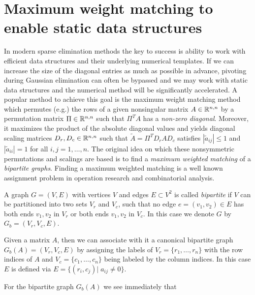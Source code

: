 \section{Maximum weight matching to enable static data structures}
\label{sec:mwm}
In modern sparse elimination methods the key to success 
is ability to work with efficient data structures and their underlying
numerical templates. If we can increase the size of the diagonal entries
as much as possible in advance, pivoting during Gaussian elimination can often 
be bypassed and we may work with static data structures and
the numerical method will be significantly accelerated. 
A popular method to achieve this goal is the
maximum weight matching method~\cite{DufK99S,olschowka:1996} 
which permutes (e.g.) the rows of a given
nonsingular matrix $A\in\mathbb{R}^{n,n}$ by a permutation matrix $\Pi\in\mathbb{R}^{n,n}$ 
such that $\Pi^TA$
has a \emph{non-zero diagonal}. Moreover, it maximizes 
the product of the absolute diagonal values  and yields diagonal
scaling matrices $D_r, D_c\in\mathbb{R}^{n,n}$ such that $\tilde A=\Pi^TD_rAD_c$ satisfies
$|\tilde a_{ij}|\leqslant 1$ and $|\tilde a_{ii}|=1$ for all $i,j=1,\dots,n$.
The original idea on which these nonsymmetric permutations and scalings are
based is to find a \emph{maximum weighted matching} of a
\emph{bipartite graphs}. Finding a maximum weighted matching is a well
known assignment problem in operation research and combinatorial
analysis.
\begin{definition}\label{def:bipartite}
A graph $G=(V,E)$ with vertices $V$ and edges $E\subset V^2$ 
is called \emph{bipartite} 
if $V$ can be partitioned into two sets  $V_r$ and  $V_c$, such that no edge
$e=(v_1,v_2) \in E$ has both ends $v_1,v_2$ in $V_r$ or both ends $v_1,v_2$ 
in $V_c$. In this case we denote $G$ by $G_b=(V_r,V_c,E)$.
\end{definition}
\begin{definition}\label{def:bipartite-graph}
Given a matrix $A$, then we can associate with it a canonical
bipartite graph $G_b(A)=(V_r,V_c,E)$ by assigning the 
labels of $V_r=\{r_1,\dots,r_n\}$ 
with the row indices of $A$ and 
$V_c=\{c_1,\dots,c_n\}$ being labeled by the column indices.
In this case $E$ is defined via $E=\{(r_i,c_j)|\; a_{ij}\not=0\}$.
\end{definition}
For the bipartite graph $G_b(A)$ we see immediately that 
